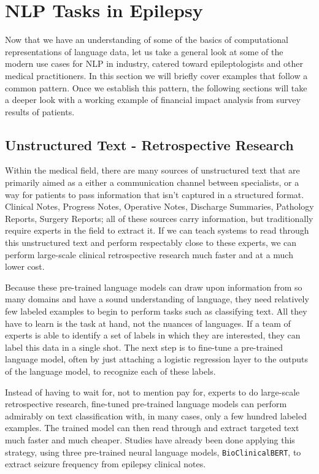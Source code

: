 \section{NLP Tasks in Epilepsy}

Now that we have an understanding of some of the basics of computational representations of language data, let us take a general look at some of the modern use cases for NLP in industry,
catered toward epileptologists and other medical practitioners. In this section we will briefly cover examples that follow a common pattern. Once we establish this pattern, the
following sections will take a deeper look with a working example of financial impact analysis from survey results of patients.

\subsection{Unstructured Text - Retrospective Research}
Within the medical field, there are many sources of unstructured text that are primarily aimed as a either a communication channel between specialists, or a way for patients to pass information that isn't captured in a structured format.
Clinical Notes, Progress Notes, Operative Notes, Discharge Summaries, Pathology Reports, Surgery Reports; all of these sources carry information, but traditionally require experts in the field to extract it.
If we can teach systems to read through this unstructured text and perform respectably close to these experts, we can perform large-scale clinical retrospective research much faster and at a much lower cost.

Because these pre-trained language models can draw upon information from so many domains and have a sound understanding of language, they need relatively few
labeled examples to begin to perform tasks such as classifying text. All they have to learn is the task at hand, not the nuances of languages.
If a team of experts is able to identify a set of labels in which they are interested, they can label this data in a single shot. The next step is to fine-tune a pre-trained language model, often by just attaching a logistic regression layer to the outputs of the language model,
to recognize each of these labels.

Instead of having to wait for, not to mention pay for, experts to do large-scale retrospective research, fine-tuned pre-trained language models can perform admirably on text classification with, in many cases, only a few hundred labeled examples.
The trained model can then read through and extract targeted text much faster and much cheaper.
Studies have already been done applying this strategy, using three pre-trained neural language models, \texttt{Bio\textunderscore ClinicalBERT}, to extract
seizure frequency from epilepsy clinical notes.\cite{10.1093/jamia/ocac018}

